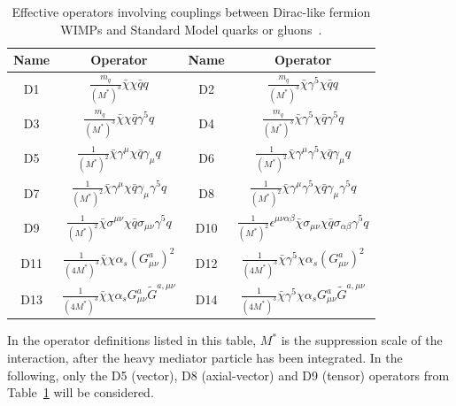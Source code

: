 \begin{table}[tb]
\begin{center}
\begin{tabular}{|cc|cc|}
\hline
\textbf{Name} & \textbf{Operator} & \textbf{Name} & \textbf{Operator} \\
\hline
D1  & $\frac{m_q}{(M^{\ast})^3} \bar{\chi}\chi \bar{q}q$                                         & D2  & $\frac{m_q}{(M^{\ast})^3} \bar{\chi} \gamma^5 \chi \bar{q}q$ \\
D3  & $\frac{m_q}{(M^{\ast})^3} \bar{\chi}\chi \bar{q}\gamma^5 q$                                & D4  & $\frac{m_q}{(M^{\ast})^3} \bar{\chi} \gamma^5 \chi \bar{q} \gamma^5 q$ \\
D5  & $\frac{1}{(M^{\ast})^2} \bar{\chi}\gamma^{\mu} \chi \bar{q} \gamma_{\mu} q$                & D6  & $\frac{1}{(M^{\ast})^2} \bar{\chi}\gamma^{\mu}\gamma^5 \chi \bar{q} \gamma_{\mu} q$ \\
D7  & $\frac{1}{(M^{\ast})^2} \bar{\chi}\gamma^{\mu} \chi \bar{q} \gamma_{\mu} \gamma^5 q$       & D8  & $\frac{1}{(M^{\ast})^2} \bar{\chi}\gamma^{\mu}\gamma^5 \chi \bar{q} \gamma_{\mu} \gamma^5 q$ \\
D9  & $\frac{1}{(M^{\ast})^2} \bar{\chi}\sigma^{\mu\nu} \chi \bar{q} \sigma_{\mu\nu} \gamma^5 q$ & D10 & $\frac{1}{(M^{\ast})^2} \epsilon^{\mu\nu\alpha\beta}\bar{\chi}\sigma_{\mu\nu} \chi \bar{q} \sigma_{\alpha\beta} \gamma^5 q$ \\
D11 & $\frac{1}{(4 M^{\ast})^3} \bar{\chi}\chi \alpha_s (G^a_{\mu\nu})^2$                        & D12 & $\frac{1}{(4 M^{\ast})^3} \bar{\chi} \gamma^5 \chi \alpha_s (G^a_{\mu\nu})^2$ \\
D13 & $\frac{1}{(4 M^{\ast})^3} \bar{\chi}\chi \alpha_s G^a_{\mu\nu} \tilde{G}^{a,\mu\nu}$       & D14 & $\frac{1}{(4 M^{\ast})^3} \bar{\chi} \gamma^5 \chi \alpha_s G^a_{\mu\nu} \tilde{G}^{a,\mu\nu}$ \\
\hline
\end{tabular}
\end{center}
\caption[Effective operators involving couplings between Dirac-like fermion WIMPs and Standard Model quarks or gluons.]{Effective operators involving couplings between Dirac-like fermion WIMPs and Standard Model quarks or gluons~\protect\cite{Goodman:2010ku}.}
\label{tab:WIMPsEffectiveOperators}
\end{table}

In the operator definitions listed in this table, $M^{\ast}$ is the suppression scale of the interaction, after the heavy mediator particle has been integrated.
In the following, only the D5 (vector), D8 (axial-vector) and D9 (tensor) operators from Table~\ref{tab:WIMPsEffectiveOperators} will be considered.

